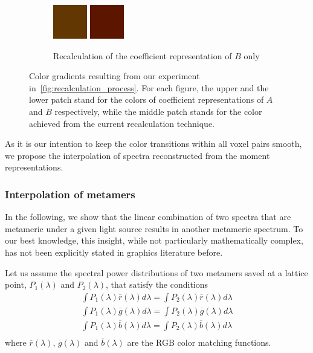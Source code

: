 \begin{figure}[t!]
\begin{subfigure}[t]{0.30\textwidth}
		\includegraphics[width=1\linewidth,height=4em]{img/recalculation_color_fitRed.png}
		\includegraphics[width=1\linewidth,height=4em]{img/recalculation_color_red.png}
		\caption{Recalculation of the coefficient representation of $B$ only}
		\label{fig:recalculation_colorGradients_red}
	\end{subfigure}
	\caption{Color gradients resulting from our experiment in~\cref{fig:recalculation_process}. For each figure, the upper and the lower patch stand for the colors of coefficient representations of $A$ and $B$ respectively, while the middle patch stands for the color achieved from the current recalculation technique.}
	\label{fig:recalculation_colorGradients}
\end{figure}

As it is our intention to keep the color transitions within all voxel pairs smooth, we propose the interpolation of spectra reconstructed from the moment representations.

\subsubsection{Interpolation of metamers}
\label{sect:ims}
In the following, we show that the linear combination of two spectra that are metameric under a given light source results in another metameric spectrum. To our best knowledge, this insight, while not particularly mathematically complex, has not been explicitly stated in graphics literature before.

Let us assume the spectral power distributions of two metamers saved at a lattice point, $P_1(\lambda)$ and $P_2(\lambda)$, that satisfy the conditions
\begin{equation} 
\begin{aligned}
\int P_1(\lambda)\overline{r}(\lambda)d\lambda=\int P_2(\lambda)\overline{r}(\lambda)d\lambda\\
\int P_1(\lambda)\overline{g}(\lambda)d\lambda=\int P_2(\lambda)\overline{g}(\lambda)d\lambda\\
\int P_1(\lambda)\overline{b}(\lambda)d\lambda=\int P_2(\lambda)\overline{b}(\lambda)d\lambda\\
\end{aligned}
\label{equation:metamers}
\end{equation}
where $\overline{r}(\lambda)$, $\overline{g}(\lambda)$ and $\overline{b}(\lambda)$ are the RGB color matching functions.

